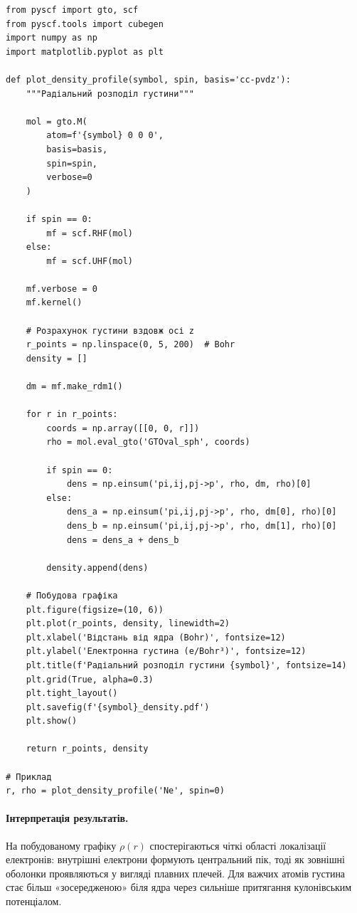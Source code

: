 \begin{verbatim}
from pyscf import gto, scf
from pyscf.tools import cubegen
import numpy as np
import matplotlib.pyplot as plt

def plot_density_profile(symbol, spin, basis='cc-pvdz'):
    """Радіальний розподіл густини"""

    mol = gto.M(
        atom=f'{symbol} 0 0 0',
        basis=basis,
        spin=spin,
        verbose=0
    )

    if spin == 0:
        mf = scf.RHF(mol)
    else:
        mf = scf.UHF(mol)

    mf.verbose = 0
    mf.kernel()

    # Розрахунок густини вздовж осі z
    r_points = np.linspace(0, 5, 200)  # Bohr
    density = []

    dm = mf.make_rdm1()

    for r in r_points:
        coords = np.array([[0, 0, r]])
        rho = mol.eval_gto('GTOval_sph', coords)

        if spin == 0:
            dens = np.einsum('pi,ij,pj->p', rho, dm, rho)[0]
        else:
            dens_a = np.einsum('pi,ij,pj->p', rho, dm[0], rho)[0]
            dens_b = np.einsum('pi,ij,pj->p', rho, dm[1], rho)[0]
            dens = dens_a + dens_b

        density.append(dens)

    # Побудова графіка
    plt.figure(figsize=(10, 6))
    plt.plot(r_points, density, linewidth=2)
    plt.xlabel('Відстань від ядра (Bohr)', fontsize=12)
    plt.ylabel('Електронна густина (e/Bohr³)', fontsize=12)
    plt.title(f'Радіальний розподіл густини {symbol}', fontsize=14)
    plt.grid(True, alpha=0.3)
    plt.tight_layout()
    plt.savefig(f'{symbol}_density.pdf')
    plt.show()

    return r_points, density

# Приклад
r, rho = plot_density_profile('Ne', spin=0)
\end{verbatim}

\paragraph{Інтерпретація результатів.}
На побудованому графіку $\rho(r)$ спостерігаються чіткі області локалізації електронів:
внутрішні електрони формують центральний пік, тоді як зовнішні оболонки проявляються у вигляді плавних плечей.
Для важчих атомів густина стає більш «зосередженою» біля ядра через сильніше притягання кулонівським потенціалом.

